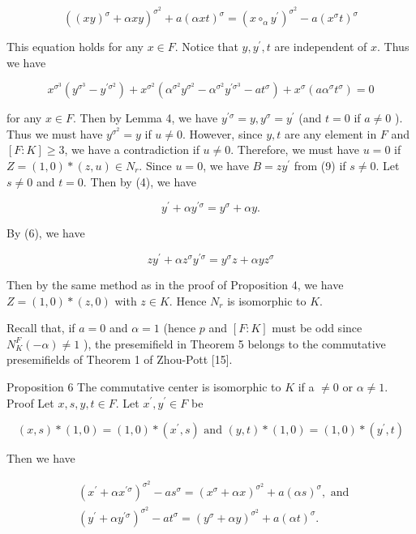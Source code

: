 \documentclass[10pt]{article}
\begin{document}
$$
\left((x y)^{\sigma}+\alpha x y\right)^{\sigma^{2}}+a(\alpha x t)^{\sigma}=\left(x \circ_{\alpha} y^{\prime}\right)^{\sigma^{2}}-a\left(x^{\sigma} t\right)^{\sigma}
$$

This equation holds for any $x \in F$. Notice that $y, y^{\prime}, t$ are independent of $x$. Thus we have

$$
x^{\sigma^{3}}\left(y^{\sigma^{3}}-y^{\prime \sigma^{2}}\right)+x^{\sigma^{2}}\left(\alpha^{\sigma^{2}} y^{\sigma^{2}}-\alpha^{\sigma^{2}} y^{\prime \sigma^{3}}-a t^{\sigma}\right)+x^{\sigma}\left(a \alpha^{\sigma} t^{\sigma}\right)=0
$$

for any $x \in F$. Then by Lemma 4, we have $y^{\prime \sigma}=y, y^{\sigma}=y^{\prime}$ (and $t=0$ if $a \neq 0$ ). Thus we must have $y^{\sigma^{2}}=y$ if $u \neq 0$. However, since $y, t$ are any element in $F$ and $[F: K] \geq 3$, we have a contradiction if $u \neq 0$. Therefore, we must have $u=0$ if $Z=(1,0) *(z, u) \in N_{r}$. Since $u=0$, we have $B=z y^{\prime}$ from (9) if $s \neq 0$. Let $s \neq 0$ and $t=0$. Then by (4), we have

$$
y^{\prime}+\alpha y^{\prime \sigma}=y^{\sigma}+\alpha y .
$$

By (6), we have

$$
z y^{\prime}+\alpha z^{\sigma} y^{\prime \sigma}=y^{\sigma} z+\alpha y z^{\sigma}
$$

Then by the same method as in the proof of Proposition 4, we have $Z=(1,0) *(z, 0)$ with $z \in K$. Hence $N_{r}$ is isomorphic to $K$.

Recall that, if $a=0$ and $\alpha=1$ (hence $p$ and $[F: K]$ must be odd since $N_{K}^{F}(-\alpha) \neq 1$ ), the presemifield in Theorem 5 belongs to the commutative presemifields of Theorem 1 of Zhou-Pott [15].

Proposition 6 The commutative center is isomorphic to $K$ if a $\neq 0$ or $\alpha \neq 1$.\\
Proof Let $x, s, y, t \in F$. Let $x^{\prime}, y^{\prime} \in F$ be

$$
(x, s) *(1,0)=(1,0) *\left(x^{\prime}, s\right) \text { and }(y, t) *(1,0)=(1,0) *\left(y^{\prime}, t\right)
$$

Then we have


\begin{align*}
& \left(x^{\prime}+\alpha x^{\prime \sigma}\right)^{\sigma^{2}}-a s^{\sigma}=\left(x^{\sigma}+\alpha x\right)^{\sigma^{2}}+a(\alpha s)^{\sigma}, \text { and }  \tag{11}\\
& \left(y^{\prime}+\alpha y^{\prime \sigma}\right)^{\sigma^{2}}-a t^{\sigma}=\left(y^{\sigma}+\alpha y\right)^{\sigma^{2}}+a(\alpha t)^{\sigma} . \tag{12}
\end{align*}
\end{document}
